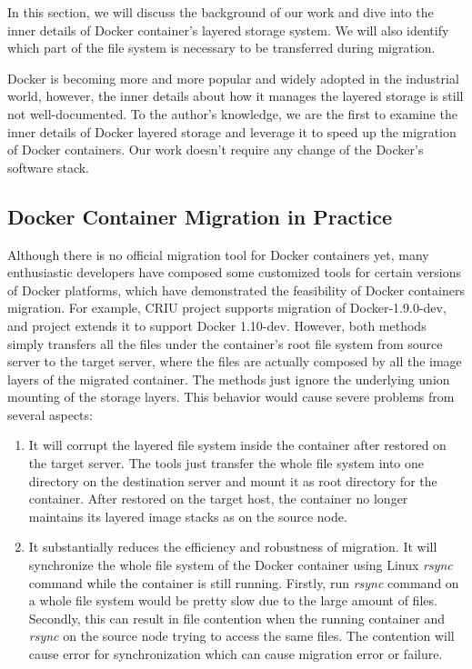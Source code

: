 
In this section, we will discuss the background of our work and dive into the inner details of Docker container's layered storage system. We will also identify which part of the file system is necessary to be transferred during migration. 

Docker is becoming more and more popular and widely adopted in the industrial world, however, the inner details about how it manages the layered storage is still not well-documented. 
To the author's knowledge, we are the first to examine the inner details of Docker layered storage and leverage it to speed up the migration of Docker containers. Our work doesn't require any change of the Docker's software stack.





\subsection{Docker Container Migration in Practice }\label{migpractice}




Although there is no official  migration tool for Docker containers yet, many enthusiastic developers have composed some customized tools for certain versions of Docker platforms, which have demonstrated the feasibility of Docker containers  migration. For example, CRIU project \cite{criu} supports migration of Docker-1.9.0-dev, and project \cite{boucherPhaul} 
 extends it to support Docker 1.10-dev. However, both methods simply transfers all the files under the container's root file system from source server to the target server, where the files are actually composed by all the image layers of the migrated container. The methods just ignore the underlying union mounting of the storage layers.
This behavior would cause severe problems from several aspects:
\begin{enumerate}[series = tobecont]
    \item It will corrupt the layered file system inside the container after restored  on the target server. The tools just transfer the whole file system into one directory on the destination server and mount it as root directory for the container. After restored on the target host, the container no longer maintains its layered image stacks as on the source node. 
    \item It substantially reduces the efficiency and robustness of migration.
    It will synchronize the whole file system of the Docker container using Linux \textit{rsync} command while the container is still running. Firstly, run \textit{rsync} command on a whole file system would be pretty slow due to the large amount of files.  Secondly, this can result in file contention when the running container and \textit{rsync} on the source node trying to access the same files. The contention will cause error for synchronization which can cause migration error or failure. 
\end{enumerate}

